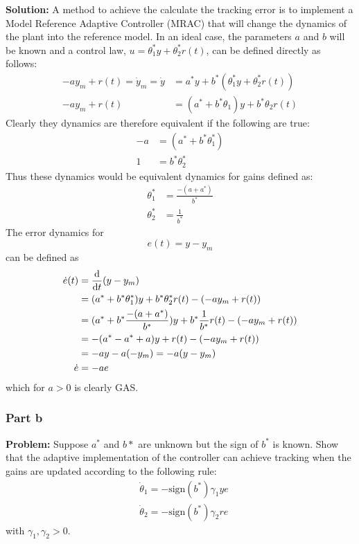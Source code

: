 \documentclass[letter]{article}
\begin{document}
\noindent
\textbf{Solution:}
A method to achieve the calculate the tracking error is to implement a Model Reference Adaptive Controller (MRAC) that will change the dynamics of the plant into the reference model. In an ideal case, the parameters $a$ and $b$ will be known and a control law, $u = \theta_1^* y + \theta_2^* r(t)$, can be defined directly as follows:
\begin{align}
	-a y_m + r(t) = \dot{y}_m = \dot{y}
	&= a^* y + b^* (\theta_1^* y + \theta_2^* r(t))\\
	-a y_m + r(t)
	&= (a^* + b^* \theta_1) y + b^* \theta_2 r(t)
\end{align}
Clearly they dynamics are therefore equivalent if the following are true:
\begin{align}
	- a &= (a^* + b^* \theta_1^*)\\
	1	&= b^* \theta_2^*
\end{align}
Thus these dynamics would be equivalent dynamics for gains defined as:
\begin{align}
	\theta_1^* &= \frac{-(a + a^*)}{b^*}\\
	\theta_2^* &= \frac{1}{b^*}
\end{align}
The error dynamics for $$e(t) = y - y_m$$ can be defined as
\begin{align}
	\dot{e}(t) &= \dv{t} (y - y_m)\\
	&= (a^* + b^* \theta_1^*) y + b^* \theta_2^* r(t) - ( -a y_m + r(t))\\
	&= (a^* + b^* \frac{-(a + a^*)}{b^*}) y + b^* \frac{1}{b^*} r(t) - ( -a y_m + r(t))\\
	&= -(a^* - a^* + a)y + r(t) - (-a y_m + r(t))\\
	&= -a y - a (-y_m) = -a (y-y_m)\\
	\dot{e} &= - a e
\end{align}
which for $a>0$ is clearly GAS.


\subsubsection{Part b}
\textbf{Problem:}
Suppose $a^*$ and $b*$ are unknown but the sign of $b^*$ is known. Show that the adaptive implementation of the controller can achieve tracking when the gains are updated according to the following rule:
\begin{equation} \label{eq:dot_theta}
	\begin{aligned}
		& \dot{\theta}_1 = - \text{sign}(b^*) \gamma_1 y e\\
		& \dot{\theta}_2 = - \text{sign}(b^*) \gamma_2 r e
	\end{aligned}
\end{equation}
with $\gamma_1, \gamma_2 > 0$.\\
\end{document}
